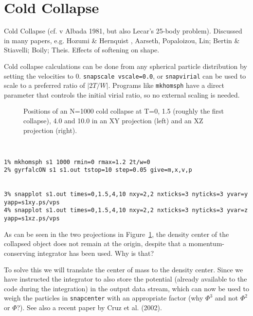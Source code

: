 \section{Cold Collapse}


Cold Collapse (cf. v Albada 1981, but also Lecar's 25-body problem).
Discussed in many papers, e.g. Hozumi \& Hernquist ,
Aarseth, Popaloizou, Lin;  Bertin \& Stiavelli; Boily; Theis. Effects
of softening on shape.

Cold collapse calculations can be done from any spherical particle
distribution by setting the velocities to 0. {\tt snapscale vscale=0.0},
or {\tt snapvirial} can be used to scale to a preferred ratio of $|2T/W|$.
Programs like {\tt mkhomsph} have a direct parameter that controls
the initial virial ratio, so no external scaling is needed.



\begin{figure}[htb]
\caption[Cold Collapse of an N=1000 system]
{Positions of an N=1000 cold collapse at T=0, 1.5 (roughly
the first collapse), 4.0 and 10.0 in an XY projection (left) 
and an XZ projection (right).}
\label{f:s1xy}
\end{figure}

\footnotesize\begin{verbatim}


1% mkhomsph s1 1000 rmin=0 rmax=1.2 2t/w=0
2% gyrfalcON s1 s1.out tstop=10 step=0.05 give=m,x,v,p


3% snapplot s1.out times=0,1.5,4,10 nxy=2,2 nxticks=3 nyticks=3 yvar=y yapp=s1xy.ps/vps
4% snapplot s1.out times=0,1.5,4,10 nxy=2,2 nxticks=3 nyticks=3 yvar=z yapp=s1xz.ps/vps

\end{verbatim}\normalsize

As can be seen in the two projections in Figure~\ref{f:s1xy}, the density center
of the collapsed object does not remain at the origin, despite that a 
momentum-conserving integrator has been used. Why is that?

To solve this we will translate the center of mass to the density center. Since
we have instructed the integrator to also store the potential (already
available to the code during the integration) in the output data stream, which
can now be used to weigh the particles in {\tt snapcenter} with an appropriate
factor (why $\Phi^3$ and not $\Phi^2$ or $\Phi$?). See also  a recent
paper by Cruz et al. (2002).

